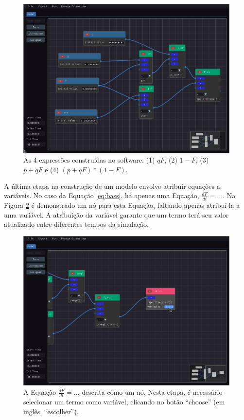 \documentclass[
	12pt,				%
	openright,			%
	oneside,			%
	a4paper,			%
	main=brazil,
	english,			%
	]{ufsj-abntex2}
\begin{document}
\begin{figure}[h]
    \centering
    \includegraphics[width=\textwidth]{imgs/ode-designer/passo-a-passo/expressoes.png} 
    \caption{As 4 expressões construídas no software: (1) $qF$, (2) $1-F$, (3) $p+qF$ e (4) $(p+qF)*(1-F)$.}
    \label{fig:expressoes}
\end{figure}

A última etapa na construção de um modelo envolve atribuir equações a variáveis. No caso da Equação \ref{eq:bass}, há apenas uma Equação, $\frac{dF}{dt} = \dots$. Na Figura \ref{fig:equacao} é demonstrado um nó para esta Equação, faltando apenas atribuí-la a uma variável. A atribuição da variável garante que um termo terá seu valor atualizado entre diferentes tempos da simulação.

\begin{figure}[h]
    \centering
    \includegraphics[width=\textwidth]{imgs/ode-designer/passo-a-passo/equacao.png} 
    \caption{A Equação $\frac{dF}{dt} = \dots$ descrita como um nó. Nesta etapa, é necessário selecionar um termo como variável, clicando no botão ``choose'' (em inglês, ``escolher'').}
    \label{fig:equacao}
\end{figure}
\end{document}
